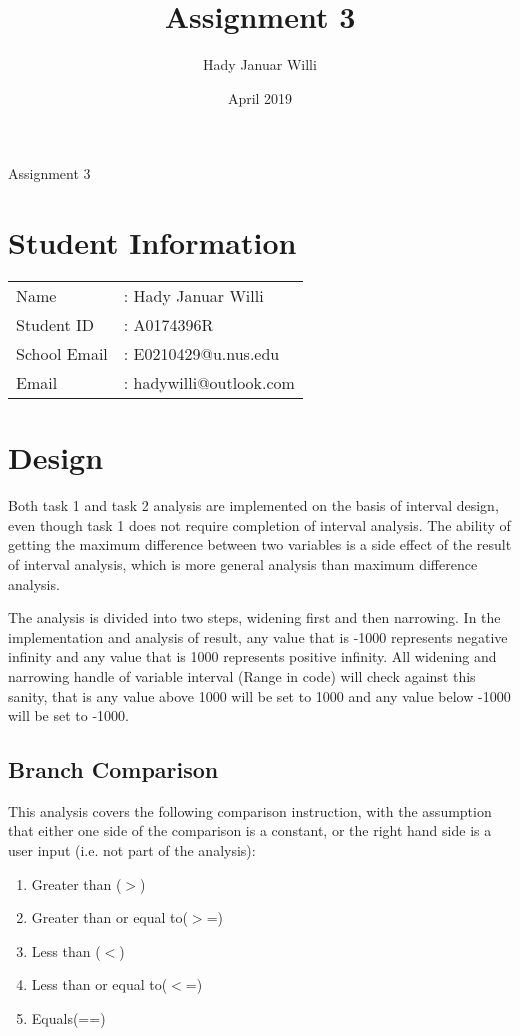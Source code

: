 \documentclass[11pt,a4paper,fleqn]{article}
\title{Assignment 3}
\author{Hady Januar Willi}
\date{April 2019}
\begin{document}
\begin{center}
   \LARGE Assignment 3
\end{center}
\section{Student Information}

\begin{tabular}{l l}
   Name         & : Hady Januar Willi     \\
   Student ID   & : A0174396R             \\
   School Email & : E0210429@u.nus.edu    \\
   Email        & : hadywilli@outlook.com \\
\end{tabular}

\section{Design}

Both task 1 and task 2 analysis are implemented on the basis of interval design, even though task 1 does not require completion of interval analysis.
The ability of getting the maximum difference between two variables is a side effect of the result of interval analysis, which is more general analysis than maximum difference analysis.

The analysis is divided into two steps, widening first and then narrowing.
In the implementation and analysis of result, any value that is -1000 represents negative infinity and any value that is 1000 represents positive infinity.
All widening and narrowing handle of variable interval (Range in code) will check against this sanity, that is any value above 1000 will be set to 1000 and any value below -1000 will be set to -1000.

\subsection{Branch Comparison}

This analysis covers the following comparison instruction, with the assumption that either one side of the comparison is a constant, or the right hand side is a user input (i.e. not part of the analysis):

\begin{enumerate}
   \item Greater than ($>$)
   \item Greater than or equal to($>$=)
   \item Less than ($<$)
   \item Less than or equal to($<$=)
   \item Equals(==)
\end{enumerate}
\end{document}
